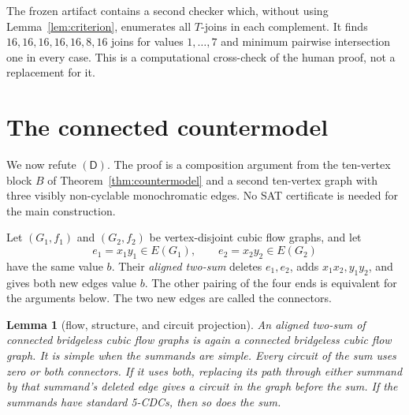 \documentclass[11pt]{article}
\newtheorem{lemma}[theorem]{Lemma}
\theoremstyle{definition}
\theoremstyle{remark}
\begin{document}
The frozen artifact contains a second checker which, without using
Lemma~\ref{lem:criterion}, enumerates all \(T\)-joins in each complement.
It finds \(16,16,16,16,16,8,16\) joins for values \(1,\ldots,7\) and
minimum pairwise intersection one in every case.  This is a computational
cross-check of the human proof, not a replacement for it.

\section{The connected countermodel}
\label{sec:countermodel40}

We now refute \((\mathsf D)\).  The proof is a composition argument from
the ten-vertex block \(B\) of Theorem~\ref{thm:countermodel} and a second
ten-vertex graph with three visibly non-cyclable monochromatic edges.  No
SAT certificate is needed for the main construction.

Let \((G_1,f_1)\) and \((G_2,f_2)\) be vertex-disjoint cubic flow graphs,
and let
\[
 e_1=x_1y_1\in E(G_1),\qquad e_2=x_2y_2\in E(G_2)
\]
have the same value \(b\).  Their \emph{aligned two-sum} deletes
\(e_1,e_2\), adds \(x_1x_2,y_1y_2\), and gives both new edges value \(b\).
The other pairing of the four ends is equivalent for the arguments
below.  The two new edges are called the connectors.

\begin{lemma}[flow, structure, and circuit projection]
\label{lem:twosum-flow}
An aligned two-sum of connected bridgeless cubic flow graphs is again a
connected bridgeless cubic flow graph.  It is simple when the summands are
simple.  Every circuit of the sum uses zero or both connectors.  If it
uses both, replacing its path through either summand by that summand's
deleted edge gives a circuit in the graph before the sum.
If the summands have standard 5-CDCs, then so does the sum.
\end{lemma}
\end{document}

